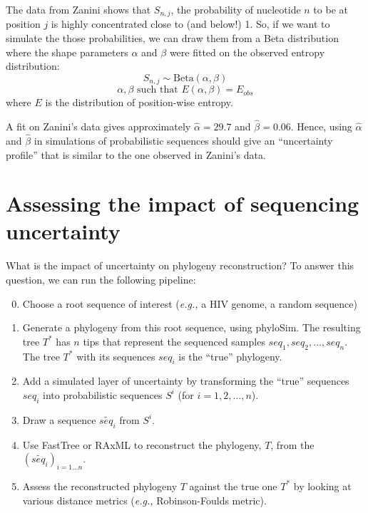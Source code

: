 \documentclass[12pt]{article}
\newcommand{\betadist}[1]{\mathrm{Beta}\left(#1\right)}
\newcommand{\eg}{\textit{e.g.,}\xspace}
\begin{document}
The data from Zanini shows that $S_{n,j}$, the probability of nucleotide $n$ to be at position $j$ is highly concentrated close to (and below!) 1. 
So, if we want to simulate the those probabilities, we can draw them from a Beta distribution where the shape parameters $\alpha$ and $\beta$ were fitted on the observed entropy distribution:
\begin{equation}
S_{n,j} \sim \betadist{\alpha, \beta}
\end{equation}
\begin{equation}
\alpha, \beta \text{ such that } E(\alpha,\beta) = E_{obs}
\end{equation}
where $E$ is the distribution of position-wise entropy.

A fit on Zanini's data gives approximately $\hat{\alpha} = 29.7$ and $\hat{\beta} = 0.06$. Hence, using $\hat{\alpha}$ and $\hat{\beta}$ in simulations of probabilistic sequences should give an ``uncertainty profile'' that is similar to the one observed in Zanini's data. 



\section{Assessing the impact of sequencing uncertainty}


What is the impact of uncertainty on phylogeny reconstruction? 
To answer this question, we can run the following pipeline:

\begin{enumerate}
\setcounter{enumi}{-1} 
\item Choose a root sequence of interest (\eg a HIV genome, a random sequence)
\item Generate a phylogeny from this root sequence, using \textsf{phyloSim}. The resulting tree $T^*$ has $n$ tips that represent the sequenced samples $seq_1, seq_2,\ldots, seq_n$. The tree $T^*$ with its sequences $seq_i$ is the ``true'' phylogeny.
\item Add a simulated layer of uncertainty by transforming the ``true'' sequences $seq_i$ into probabilistic sequences $S^i$ (for $i=1,2,\ldots,n$).
\item Draw a sequence $\widetilde{seq_i}$ from $S^i$.
\item Use \textsf{FastTree} or  \textsf{RAxML} to reconstruct the phylogeny, $T$, from the $(\widetilde{seq_i})_{i=1\ldots n}$. 
\item Assess the reconstructed phylogeny $T$ against the true one $T^*$ by looking at various distance metrics (\eg Robinson-Foulds metric).
\end{enumerate}
\end{document}
